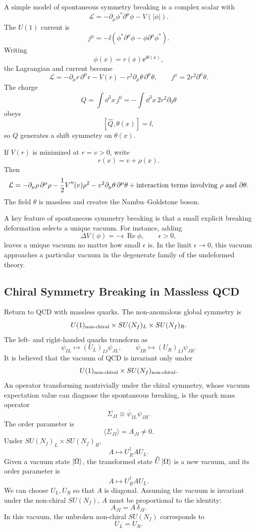 A simple model of spontaneous symmetry breaking is a complex scalar with
\[
  \mathcal L
  =
  -\partial_\mu\phi^*\partial^\mu\phi
  -V(|\phi|).
\]
The \(U(1)\) current is
\[
  j^\mu
  =
  -\ii(\phi^*\partial^\mu\phi-\phi\partial^\mu\phi^*).
\]
Writing
\[
  \phi(x)=r(x)\ee^{\ii\theta(x)},
\]
the Lagrangian and current become
\[
  \mathcal L
  =
  -\partial_\mu r\,\partial^\mu r
  -V(r)
  -r^2\partial_\mu\theta\,\partial^\mu\theta,
  \qquad
  j^\mu=2r^2\partial^\mu\theta .
\]
The charge
\[
  Q=\int\dd^3x\,j^0
  =
  -\int\dd^3x\,2r^2\partial_0\theta
\]
obeys
\[
  [\widehat Q,\widehat\theta(x)]=\ii,
\]
so \(Q\) generates a shift symmetry on \(\theta(x)\).

If \(V(r)\) is minimized at \(r=v>0\), write
\[
  r(x)=v+\rho(x).
\]
Then
\[
  \mathcal L
  =
  -\partial_\mu\rho\,\partial^\mu\rho
  -\frac12V''(v)\rho^2
  -v^2\partial_\mu\theta\,\partial^\mu\theta
  +\hbox{interaction terms involving \(\rho\) and \(\partial\theta\)}.
\]
The field \(\theta\) is massless and creates the Nambu--Goldstone boson.

A key feature of spontaneous symmetry breaking is that a small explicit
breaking deformation selects a unique vacuum.  For instance, adding
\[
  \Delta V(\phi)=-\epsilon\,\operatorname{Re}\phi,
  \qquad
  \epsilon>0,
\]
leaves a unique vacuum no matter how small \(\epsilon\) is.  In the limit
\(\epsilon\to0\), this vacuum approaches a particular vacuum in the
degenerate family of the undeformed theory.

\subsection{Chiral Symmetry Breaking in Massless QCD}

Return to QCD with massless quarks.  The non-anomalous global symmetry is
\[
  U(1)_{\rm non\text{-}chiral}
  \times SU(N_f)_L\times SU(N_f)_R .
\]
The left- and right-handed quarks transform as
\[
  \psi_{IL}\longmapsto (U_L)_{IJ}\psi_{JL},
  \qquad
  \psi_{IR}\longmapsto (U_R)_{IJ}\psi_{JR}.
\]
It is believed that the vacuum of QCD is invariant only under
\[
  U(1)_{\rm non\text{-}chiral}\times SU(N_f)_{\rm non\text{-}chiral}.
\]
An operator transforming nontrivially under the chiral symmetry, whose
vacuum expectation value can diagnose the spontaneous breaking, is the
quark mass operator
\[
  \Sigma_{JI}\equiv\overline\psi_{IL}\psi_{JR}.
\]
The order parameter is
\[
  \langle\Sigma_{JI}\rangle=A_{JI}\ne0.
\]
Under \(SU(N_f)_L\times SU(N_f)_R\),
\[
  A\longmapsto U_R^\dagger A U_L.
\]
Given a vacuum state \(\ket\Omega\), the transformed state
\(\widehat U\ket\Omega\) is a new vacuum, and its order parameter is
\[
  A\longmapsto U_R^\dagger A U_L.
\]
We can choose \(U_L,U_R\) so that \(A\) is diagonal.  Assuming the vacuum
is invariant under the non-chiral \(SU(N_f)\), \(A\) must be proportional
to the identity:
\[
  A_{JI}=A\,\delta_{JI}.
\]
In this vacuum, the unbroken non-chiral \(SU(N_f)\) corresponds to
\[
  U_L=U_R.
\]

